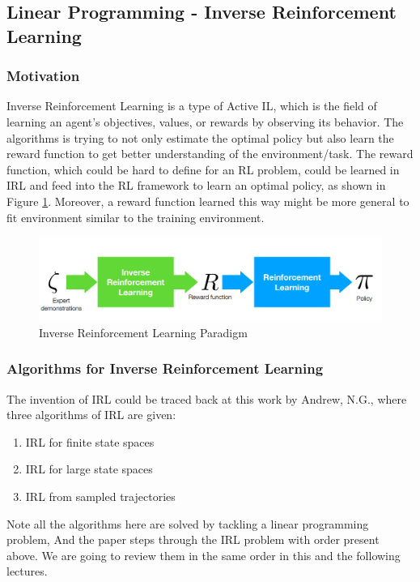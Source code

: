 \documentclass[11pt]{article}
\begin{document}
\subsection{Linear Programming - Inverse Reinforcement Learning}
\subsubsection{Motivation}
Inverse Reinforcement Learning is a type of Active IL, which is the field of learning an agent’s objectives, values, or rewards by observing its behavior. The algorithms is trying to not only estimate the optimal policy but also learn the reward function to get better understanding of the environment/task. The reward function, which could be hard to define for an RL problem, could be learned in IRL and feed into the RL framework to learn an optimal policy, as shown in Figure \ref{fig:IRL}. Moreover, a reward function learned this way might be more general to fit environment similar to the training environment.

\begin{figure}[H]
\centering
\includegraphics[width=0.8\linewidth]{2.png}
\caption{Inverse Reinforcement Learning Paradigm}
\label{fig:IRL}
\end{figure}

\subsubsection{Algorithms for  Inverse Reinforcement Learning}
The invention of IRL could be traced back at this work by Andrew, N.G.\cite{ng2000algorithms},
where three algorithms of IRL are given:
\begin{enumerate}
    \item IRL for finite state spaces
    \item IRL for large state spaces
    \item IRL from sampled trajectories
\end{enumerate}
Note all the algorithms here are solved by tackling a linear programming problem, And the paper\cite{ng2000algorithms} steps through the IRL problem with order present above. We are going to review them in the same order in this and the following lectures.
\end{document}
